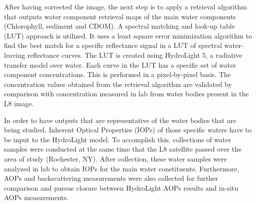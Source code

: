 After having corrected the image, the next step is to apply a retrieval algorithm that outputs water component retrieval maps of the main water components (Chlorophyll, sediment and CDOM). A spectral matching and look-up table (LUT) approach is utilized. It uses a least square error minimization algorithm to find the best match for a specific reflectance signal in a LUT of spectral water-leaving reflectance curves. The LUT is created using HydroLight 5, a radiative transfer model over water. Each curve in the LUT has a specific set of water component concentrations. This is performed in a pixel-by-pixel basis. The concentration values obtained from the retrieval algorithm are validated by comparison with concentration measured in lab from water bodies present in the L8 image.

In order to have outputs that are representative of the water bodies that are being studied, Inherent Optical Properties (IOPs) of those specific waters have to be input to the HydroLight model. To accomplish this, collections of water samples were conducted at the same time that the L8 satellite passed over the area of study (Rochester, NY). After collection, these water samples were analyzed in lab to obtain IOPs for the main water constituents. Furthermore, AOPs and backscattering measurements were also collected for further comparison and pursue closure between HydroLight AOPs results and in-situ AOPs measurements.

